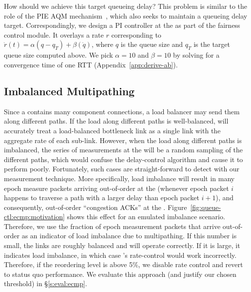 How should we achieve this target queueing delay? 
This problem is similar to the role of the PIE AQM mechanism~\cite{pie}, which also seeks to maintain a queueing delay target.
Correspondingly, we design a PI controller at the \inbox as part of the fairness control module. 
It overlays a rate $r$ corresponding to $\dot{r}(t) = \alpha (q - q_T) + \beta (\dot{q})$, where $q$ is the queue size and $q_T$ is the target queue size computed above.
We pick $\alpha = 10$ and $\beta = 10$ by solving for a convergence time of one RTT (Appendix~\ref{app:derive-ab}).

\subsection{Imbalanced Multipathing}\label{s:queue-ctl:ecmp}
Since a \bundle contains many component connections, a load balancer may send them along different paths. If the load along different paths is well-balanced, \name will accurately treat a load-balanced bottleneck link as a single link with the aggregate rate of each sub-link. However, when the load along different paths is imbalanced, the series of measurements at the \name will be a random sampling of the different paths, which would confuse the delay-control algorithm and cause it to perform poorly. Fortunately, such cases are straight-forward to detect with our measurement technique. 
More specifically, load imbalance will result in many epoch measure packets arriving out-of-order at the \outbox (whenever epoch packet $i$ happens to traverse a path with a larger delay than epoch packet $i+1$), and consequently, out-of-order ``congestion ACKs'' at the \inbox.  Figure~\ref{fig:queue-ctl:ecmp:motivation} shows this effect for an emulated imbalance scenario. Therefore, we use the fraction of epoch measurement packets that arrive out-of-order as an indicator of load imbalance due to multipathing. 
If this number is small, the links are roughly balanced and \name will operate correctly.
If it is large, it indicates load imbalance, in which case \name's rate-control would work incorrectly. 
Therefore, if the reordering level is above 5\%, we disable rate control and revert to status quo performance. We evaluate this approach (and justify our chosen threshold) in \S\ref{s:eval:ecmp}.
